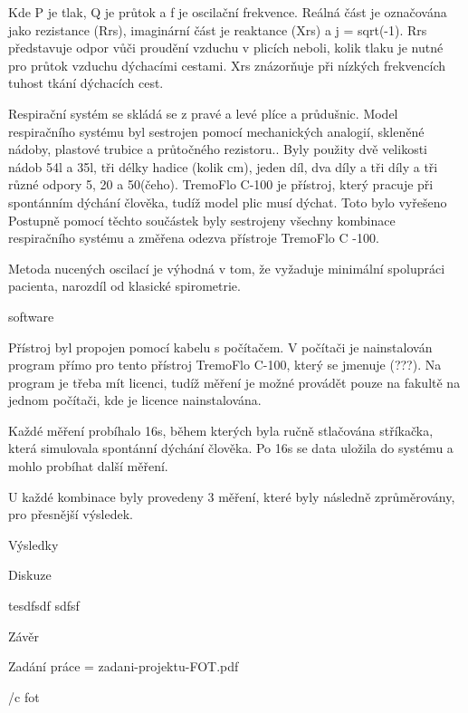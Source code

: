 Kde P je tlak, Q je průtok a f je oscilační frekvence. Reálná část je označována jako rezistance (Rrs), imaginární část je reaktance (Xrs) a j = sqrt(-1). 
Rrs představuje odpor vůči proudění vzduchu v plicích neboli, kolik tlaku je nutné pro průtok vzduchu dýchacími cestami. Xrs znázorňuje při nízkých frekvencích tuhost tkání dýchacích cest. 

 
Respirační systém se skládá se z pravé a levé plíce a průdušnic. Model respiračního systému  byl sestrojen pomocí mechanických analogií, skleněné nádoby, plastové trubice a průtočného rezistoru..  Byly použity dvě velikosti nádob 54l a 35l, tři délky hadice (kolik cm), jeden díl, dva díly a tři díly a tři různé odpory 5, 20 a 50(čeho). 
TremoFlo C-100 je přístroj, který pracuje při spontánním dýchání člověka, tudíž model plic musí dýchat. Toto bylo vyřešeno  
Postupně pomocí těchto součástek byly sestrojeny všechny kombinace respiračního systému a změřena odezva přístroje TremoFlo C -100. 

Metoda nucených oscilací je výhodná v tom, že vyžaduje minimální spolupráci pacienta, narozdíl od klasické spirometrie. 

software 

Přístroj byl propojen pomocí kabelu s počítačem. V počítači je nainstalován program přímo pro tento přístroj TremoFlo C-100, který se jmenuje (???). Na program je třeba mít licenci, tudíž měření je možné provádět pouze na fakultě na jednom počítači, kde je licence nainstalována. 


Každé měření probíhalo 16s, během kterých byla ručně stlačována stříkačka, která simulovala spontánní dýchání člověka. Po 16s se data uložila do systému a mohlo probíhat další měření. 

U každé kombinace byly provedeny 3 měření, které byly následně zprůměrovány, pro přesnější výsledek. 


\chap Výsledky

\chap Diskuze


tesdfsdf \break
sdfsf

\chap Závěr



\app Zadání práce
\picw=\hsize %
\cinspic zadani-projektu-FOT.pdf


\bibchap
\usebbl/c fot


\bye
